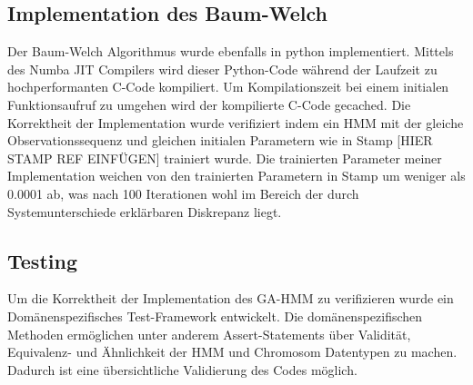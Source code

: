 \subsection*{Implementation des Baum-Welch}
Der Baum-Welch Algorithmus wurde ebenfalls in python implementiert. Mittels des Numba JIT Compilers wird dieser Python-Code während der Laufzeit zu hochperformanten C-Code kompiliert. Um Kompilationszeit bei einem initialen Funktionsaufruf zu umgehen wird der kompilierte C-Code gecached. Die Korrektheit der Implementation wurde verifiziert indem ein HMM mit der gleiche Observationssequenz und gleichen initialen Parametern wie in Stamp [HIER STAMP REF EINFÜGEN] trainiert wurde. Die trainierten Parameter meiner Implementation weichen von den trainierten Parametern in Stamp um weniger als 0.0001 ab, was nach 100 Iterationen wohl im Bereich der durch Systemunterschiede erklärbaren Diskrepanz liegt.

\subsection*{Testing}
Um die Korrektheit der Implementation des GA-HMM zu verifizieren wurde ein Domänenspezifisches Test-Framework entwickelt. Die domänenspezifischen Methoden ermöglichen unter anderem Assert-Statements über Validität, Equivalenz- und Ähnlichkeit der HMM und Chromosom Datentypen zu machen. Dadurch ist eine übersichtliche Validierung des Codes möglich.
